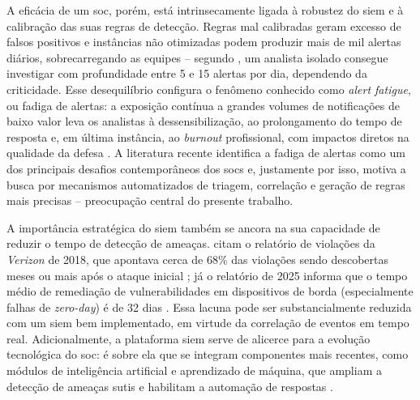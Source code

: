 A eficácia de um \gls{soc}, porém, está intrinsecamente ligada à robustez do \gls{siem} e à calibração das suas regras de detecção. 
Regras mal calibradas geram excesso de falsos positivos e instâncias não otimizadas podem produzir mais de mil alertas diários, sobrecarregando as equipes -- segundo , um analista isolado consegue investigar com profundidade entre 5 e 15 alertas por dia, dependendo da criticidade. 
Esse desequilíbrio configura o fenômeno conhecido como \textit{alert fatigue}, ou fadiga de alertas: a exposição contínua a grandes volumes de notificações de baixo valor leva os analistas à dessensibilização, ao prolongamento do tempo de resposta e, em última instância, ao \textit{burnout} profissional, com impactos diretos na qualidade da defesa \cite{tariq2025alert}. 
A literatura recente identifica a fadiga de alertas como um dos principais desafios contemporâneos dos \gls{soc}s e, justamente por isso, motiva a busca por mecanismos automatizados de triagem, correlação e geração de regras mais precisas -- preocupação central do presente trabalho.

A importância estratégica do \gls{siem} também se ancora na sua capacidade de reduzir o tempo de detecção de ameaças. 
 citam o relatório de violações da \textit{Verizon} de 2018, que apontava cerca de 68\% das violações sendo descobertas meses ou mais após o ataque inicial \cite{verizon2018dbir}; 
já o relatório de 2025 informa que o tempo médio de remediação de vulnerabilidades em dispositivos de borda (especialmente falhas de \textit{zero-day}) é de 32 dias \cite{verizon2025dbir}. 
Essa lacuna pode ser substancialmente reduzida com um \gls{siem} bem implementado, em virtude da correlação de eventos em tempo real. 
Adicionalmente, a plataforma \gls{siem} serve de alicerce para a evolução tecnológica do \gls{soc}: é sobre ela que se integram componentes mais recentes, como módulos de inteligência artificial e aprendizado de máquina, que ampliam a detecção de ameaças sutis e habilitam a automação de respostas \cite{tendikov2024siem}.


